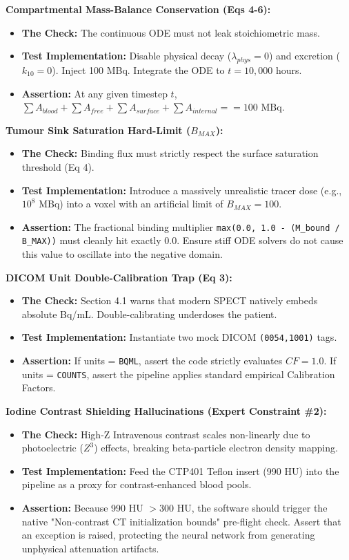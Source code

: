 \documentclass[11pt,a4paper]{article}
\begin{document}
\noindent\textbf{Compartmental Mass-Balance Conservation (Eqs 4-6):}
\begin{itemize}
    \item \textbf{The Check:} The continuous ODE must not leak stoichiometric mass.
    \item \textbf{Test Implementation:} Disable physical decay ($\lambda_{phys} = 0$) and excretion ($k_{10} = 0$). Inject 100 MBq. Integrate the ODE to $t = 10,000$ hours.
    \item \textbf{Assertion:} At any given timestep $t$, $\sum A_{blood} + \sum A_{free} + \sum A_{surface} + \sum A_{internal} == 100 \text{ MBq}$.
\end{itemize}

\noindent\textbf{Tumour Sink Saturation Hard-Limit ($B_{MAX}$):}
\begin{itemize}
    \item \textbf{The Check:} Binding flux must strictly respect the surface saturation threshold (Eq 4).
    \item \textbf{Test Implementation:} Introduce a massively unrealistic tracer dose (e.g., $10^8$ MBq) into a voxel with an artificial limit of $B_{MAX} = 100$.
    \item \textbf{Assertion:} The fractional binding multiplier \texttt{max(0.0, 1.0 - (M\_bound / B\_MAX))} must cleanly hit exactly 0.0. Ensure stiff ODE solvers do not cause this value to oscillate into the negative domain.
\end{itemize}

\noindent\textbf{DICOM Unit Double-Calibration Trap (Eq 3):}
\begin{itemize}
    \item \textbf{The Check:} Section 4.1 warns that modern SPECT natively embeds absolute Bq/mL. Double-calibrating underdoses the patient.
    \item \textbf{Test Implementation:} Instantiate two mock DICOM \texttt{(0054,1001)} tags.
    \item \textbf{Assertion:} If units = \texttt{BQML}, assert the code strictly evaluates $CF = 1.0$. If units = \texttt{COUNTS}, assert the pipeline applies standard empirical Calibration Factors.
\end{itemize}

\noindent\textbf{Iodine Contrast Shielding Hallucinations (Expert Constraint \#2):}
\begin{itemize}
    \item \textbf{The Check:} High-Z Intravenous contrast scales non-linearly due to photoelectric ($Z^3$) effects, breaking beta-particle electron density mapping.
    \item \textbf{Test Implementation:} Feed the CTP401 Teflon insert (990 HU) into the pipeline as a proxy for contrast-enhanced blood pools.
    \item \textbf{Assertion:} Because 990 HU $> 300$ HU, the software should trigger the native "Non-contrast CT initialization bounds" pre-flight check. Assert that an exception is raised, protecting the neural network from generating unphysical attenuation artifacts.
\end{itemize}
\end{document}
